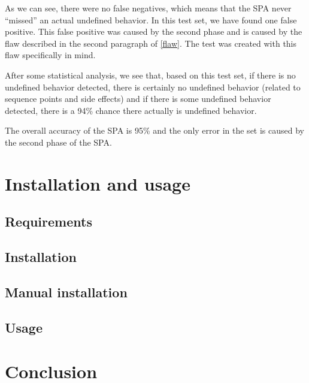 As we can see, there were no false negatives, which means that the SPA never ``missed'' an actual undefined behavior. In this test set, we have found one false positive. This false positive was caused by the second phase and is caused by the flaw described in the second paragraph of \ref{flaw}. The test was created with this flaw specifically in mind.

After some statistical analysis, we see that, based on this test set, if there is no undefined behavior detected, there is certainly no undefined behavior (related to sequence points and side effects) and if there is some undefined behavior detected, there is a 94\% chance there actually is undefined behavior.

The overall accuracy of the SPA is 95\% and the only error in the set is caused by the second phase of the SPA.

\chapter{Installation and usage}
\section{Requirements}
\section{Installation}
\section{Manual installation}
\section{Usage}
\chapter{Conclusion}
